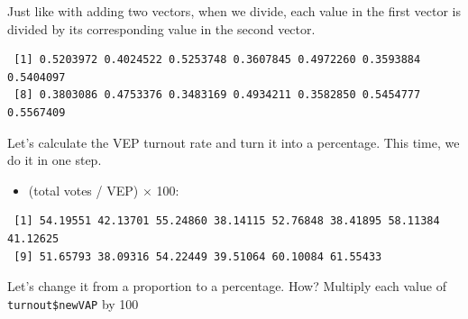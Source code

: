 \documentclass[
  letterpaper,
  DIV=11,
  numbers=noendperiod]{scrreprt}
\newenvironment{Shaded}{\begin{snugshade}}{\end{snugshade}}
\newcommand{\DecValTok}[1]{\textcolor[rgb]{0.68,0.00,0.00}{#1}}
\newcommand{\NormalTok}[1]{\textcolor[rgb]{0.00,0.23,0.31}{#1}}
\newcommand{\OtherTok}[1]{\textcolor[rgb]{0.00,0.23,0.31}{#1}}
\newcommand{\SpecialCharTok}[1]{\textcolor[rgb]{0.37,0.37,0.37}{#1}}
\providecommand{\tightlist}{%
  \setlength{\itemsep}{0pt}\setlength{\parskip}{0pt}}\usepackage{longtable,booktabs,array}
\begin{document}
Just like with adding two vectors, when we divide, each value in the
first vector is divided by its corresponding value in the second vector.

\begin{Shaded}
\end{Shaded}

\begin{verbatim}
 [1] 0.5203972 0.4024522 0.5253748 0.3607845 0.4972260 0.3593884 0.5404097
 [8] 0.3803086 0.4753376 0.3483169 0.4934211 0.3582850 0.5454777 0.5567409
\end{verbatim}

Let's calculate the VEP turnout rate and turn it into a percentage. This
time, we do it in one step.

\begin{itemize}
\tightlist
\item
  (total votes / VEP) \(\times\) 100:
\end{itemize}

\begin{Shaded}
\end{Shaded}

\begin{verbatim}
 [1] 54.19551 42.13701 55.24860 38.14115 52.76848 38.41895 58.11384 41.12625
 [9] 51.65793 38.09316 54.22449 39.51064 60.10084 61.55433
\end{verbatim}

Let's change it from a proportion to a percentage. How? Multiply each
value of \texttt{turnout\$newVAP} by 100

\begin{Shaded}
\end{Shaded}
\end{document}
